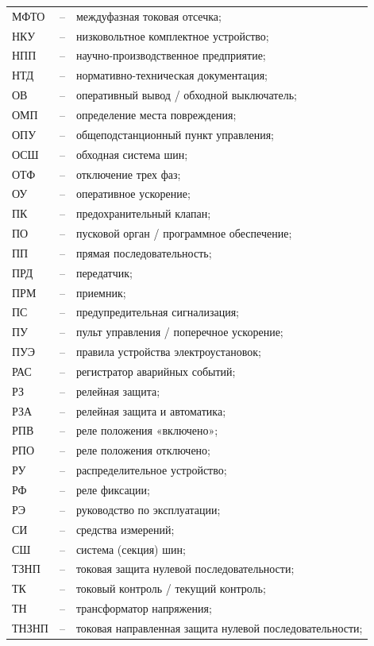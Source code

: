 \begin{longtable}{>{\raggedright\arraybackslash}m{2cm}>{\raggedright\arraybackslash}m{0.5cm}>{\raggedright\arraybackslash}m{20cm}}
МФТО & -- & междуфазная токовая отсечка; \\
НКУ & -- & низковольтное комплектное устройство; \\
НПП & -- & научно-производственное предприятие; \\
НТД & -- & нормативно-техническая документация; \\
ОВ & -- & оперативный вывод / обходной выключатель; \\
ОМП & -- & определение места повреждения; \\
ОПУ & -- & общеподстанционный пункт управления; \\
ОСШ & -- & обходная система шин; \\
ОТФ & -- & отключение трех фаз; \\
ОУ & -- & оперативное ускорение; \\
ПК & -- & предохранительный клапан; \\
ПО & -- & пусковой орган / программное обеспечение; \\
ПП & -- & прямая последовательность; \\
ПРД & -- & передатчик; \\
ПРМ & -- & приемник; \\
ПС & -- & предупредительная сигнализация; \\
ПУ & -- & пульт управления / поперечное ускорение; \\
ПУЭ & -- & правила устройства электроустановок; \\
РАС & -- & регистратор аварийных событий; \\
РЗ & -- & релейная защита; \\
РЗА & -- & релейная защита и автоматика; \\
РПВ & -- & реле положения «включено»; \\
РПО & -- & реле положения отключено; \\
РУ & -- & распределительное устройство; \\
РФ & -- & реле фиксации; \\
РЭ & -- & руководство по эксплуатации; \\
СИ & -- & средства измерений; \\
СШ & -- & система (секция) шин; \\
ТЗНП & -- & токовая защита нулевой последовательности; \\
ТК & -- & токовый контроль / текущий контроль; \\
ТН & -- & трансформатор напряжения; \\
ТНЗНП & -- & токовая направленная защита нулевой последовательности; \\

\end{longtable}
